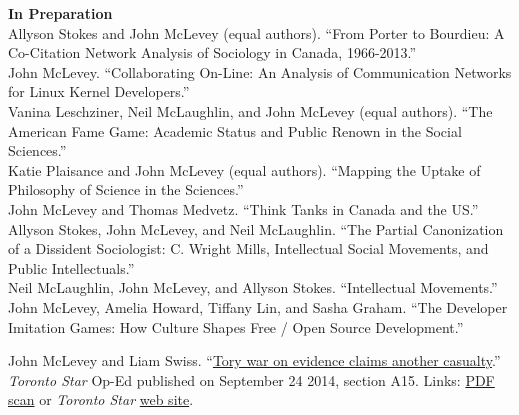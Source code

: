\documentclass[11pt,usenames,dvipsnames]{article}
\begin{document}
\ind \textbf{In Preparation} \\

\ind Allyson Stokes and John McLevey (equal authors). ``From Porter to Bourdieu: A Co-Citation Network Analysis of Sociology in Canada, 1966-2013.'' \\

\ind John McLevey. ``Collaborating On-Line: An Analysis of Communication Networks for Linux Kernel Developers.'' \\

\ind Vanina Leschziner, Neil McLaughlin, and John McLevey (equal authors). ``The American Fame Game: Academic Status and Public Renown in the Social Sciences.'' \\ 

\ind Katie Plaisance and John McLevey (equal authors). ``Mapping the Uptake of Philosophy of Science in the Sciences.'' \\

\ind John McLevey and Thomas Medvetz. ``Think Tanks in Canada and the US.'' \\

\ind Allyson Stokes, John McLevey, and Neil McLaughlin. ``The Partial Canonization of a Dissident Sociologist: C. Wright Mills, Intellectual Social Movements, and Public Intellectuals.'' \\ %

\ind Neil McLaughlin, John McLevey, and Allyson Stokes. ``Intellectual Movements.'' \\

\ind John McLevey, Amelia Howard, Tiffany Lin, and Sasha Graham. ``The Developer Imitation Games: How Culture Shapes Free / Open Source Development.'' \\




\noindent John McLevey and Liam Swiss. ``\href{http://bit.ly/1ohSn1N}{Tory war on evidence claims another casualty}.'' \emph{Toronto Star} Op-Ed published on September 24 2014, section A15. Links: \href{http://bit.ly/1ohSn1N}{PDF scan} or \emph{Toronto Star} \href{http://on.thestar.com/1vbUGbU}{web site}. \\  
\end{document}
